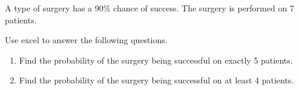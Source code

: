 \begin{exercise}

A type of surgery has a 90\% chance of success. The surgery is performed
on 7 patients.

Use excel to answer the following questions.

\begin{enumerate}
\item
  Find the probability of the surgery being successful on exactly 5
  patients.
\item
  Find the probability of the surgery being successful on at least 4
  patients.
\end{enumerate}

\end{exercise}

